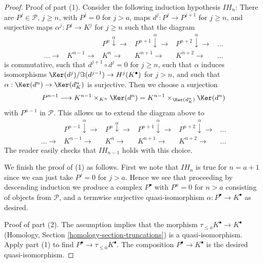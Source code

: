 \begin{proof}
Proof of part (1). Consider the following induction hypothesis $IH_n$:
There are $P^j \in \mathcal{P}$, $j \geq n$, with $P^j = 0$ for $j > a$,
maps $d^j : P^j \to P^{j + 1}$ for $j \geq n$, and surjective maps
$\alpha^j : P^j \to K^j$ for $j \geq n$ such that the diagram
$$
\begin{array}{cccccc} &  & P^n \overset{\alpha}{\downarrow}\longrightarrow & P^{n + 1} \overset{\alpha}{\downarrow}\longrightarrow & P^{n + 2} \overset{\alpha}{\downarrow}\longrightarrow & \ldots \\ \ldots \longrightarrow & K^{n - 1} \longrightarrow & K^n \longrightarrow & K^{n + 1} \longrightarrow & K^{n + 2} \longrightarrow & \ldots\end{array}
$$
is commutative, such that $d^{j + 1} \circ d^j = 0$ for $j \geq n$,
such that $\alpha$ induces isomorphisms
$\Ker(d^j)/\Im(d^{j - 1}) \to H^j(K^\bullet)$
for $j > n$, and such that $\alpha : \Ker(d^n) \to \Ker(d_K^n)$
is surjective. Then we choose a surjection
$$
P^{n - 1}
\longrightarrow
K^{n - 1} \times_{K^n} \Ker(d^n) =
K^{n - 1} \times_{\Ker(d_K^n)} \Ker(d^n)
$$
with $P^{n - 1}$ in $\mathcal{P}$. This allows us to extend the diagram
above to
$$
\begin{array}{cccccc} & P^{n - 1} \overset{\alpha}{\downarrow}\longrightarrow & P^n \overset{\alpha}{\downarrow}\longrightarrow & P^{n + 1} \overset{\alpha}{\downarrow}\longrightarrow & P^{n + 2} \overset{\alpha}{\downarrow}\longrightarrow & \ldots \\ \ldots \longrightarrow & K^{n - 1} \longrightarrow & K^n \longrightarrow & K^{n + 1} \longrightarrow & K^{n + 2} \longrightarrow & \ldots\end{array}
$$
The reader easily checks that $IH_{n - 1}$ holds with this choice.

\medskip\noindent
We finish the proof of (1) as follows.
First we note that $IH_n$ is true for $n = a + 1$ since
we can just take $P^j = 0$ for $j > a$. Hence we see that
proceeding by descending induction we produce a complex $P^\bullet$
with $P^n = 0$ for $n > a$
consisting of objects from $\mathcal{P}$, and a termwise
surjective quasi-isomorphism $\alpha : P^\bullet \to K^\bullet$ as desired.

\medskip\noindent
Proof of part (2). The assumption implies that the morphism
$\tau_{\leq a}K^\bullet \to K^\bullet$
(Homology, Section \ref{homology-section-truncations})
is a quasi-isomorphism.
Apply part (1) to find $P^\bullet \to \tau_{\leq a}K^\bullet$.
The composition $P^\bullet \to K^\bullet$ is the desired quasi-isomorphism.
\end{proof}

